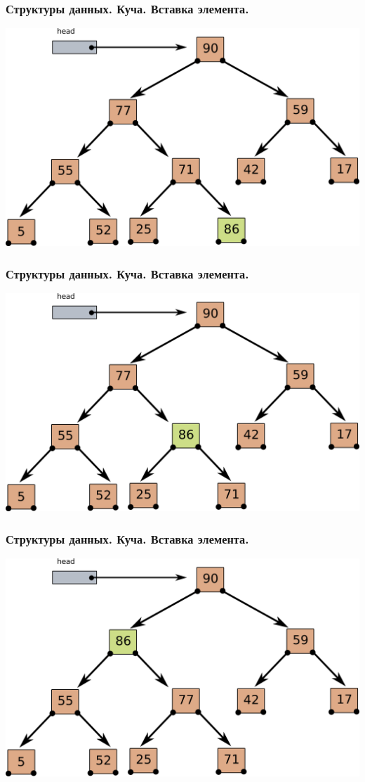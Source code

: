 \documentclass[10pt]{beamer}
\begin{document}
\begin{frame}[fragile]
\frametitle{Структуры данных. Куча. Вставка элемента.} 
\begin{center}
\includegraphics[width=0.95\linewidth]{images/heap_insert_1.png}
\end{center}
\end{frame}
\begin{frame}[fragile]
\frametitle{Структуры данных. Куча. Вставка элемента.} 
\begin{center}
\includegraphics[width=0.95\linewidth]{images/heap_insert_2.png}
\end{center}
\end{frame}
\begin{frame}[fragile]
\frametitle{Структуры данных. Куча. Вставка элемента.} 
\begin{center}
\includegraphics[width=0.95\linewidth]{images/heap_insert_3.png}
\end{center}
\end{frame}
\end{document}
